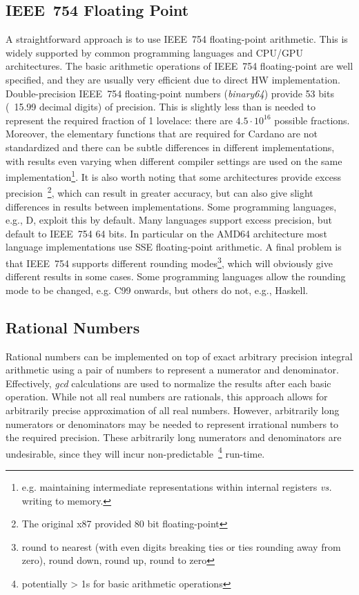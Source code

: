 \documentclass[11pt,a4paper,dvipsnames,twosided]{article}
\theoremstyle{definition}
\theoremstyle{definition}
\begin{document}
\subsection{IEEE~754 Floating Point}
\label{sec:ieee-754-floating}

A straightforward approach is to use IEEE~754 floating-point arithmetic.  This is
widely supported by common programming languages and CPU/GPU architectures.
%
The basic arithmetic operations of IEEE~754 floating-point are well specified,
and they are usually very efficient due to direct HW implementation.
%
Double-precision IEEE~754 floating-point numbers (\emph{binary64}) provide 53 bits (~15.99 decimal digits) of
precision.  This is slightly less than is needed to represent the
required fraction of 1 lovelace: there are $4.5\cdot10^{16}$ possible fractions.
Moreover, the  elementary functions that are required for Cardano are not standardized and there can be
subtle differences in different implementations, with results even varying when different compiler settings are used
on the same implementation\footnote{e.g. maintaining intermediate representations within internal registers \emph{vs.} writing to memory.}. It is also worth noting that some architectures
provide excess precision~\footnote{The original x87 provided 80 bit
  floating-point}, which can result in greater accuracy, but can also give slight differences in results
between implementations. Some programming languages, e.g., D, exploit this by default. Many
languages support excess precision, but default to IEEE~754 64 bits. In
particular on the AMD64 architecture most language implementations use SSE floating-point arithmetic.
A final problem is that IEEE~754 supports different rounding modes\footnote{round to nearest (with even digits breaking ties or ties rounding away from zero), round down, round up, round to zero},  which will obviously give
different results in some cases.  Some programming languages allow the rounding mode to be changed, e.g. C99 onwards, but others do
not, e.g., Haskell.

\subsection{Rational Numbers}
\label{sec:rational-numbers}

Rational numbers can be implemented on top of exact arbitrary precision integral
arithmetic using a pair of numbers to represent a numerator and denominator.
Effectively, \emph{gcd} calculations are used to normalize the results
after each basic operation. While not all real numbers are rationals, this approach allows for
arbitrarily precise approximation of all real numbers. However, arbitrarily
long numerators or denominators may be needed to represent irrational numbers to the required precision.
These arbitrarily long numerators and denominators are undesirable, since they will incur non-predictable~\footnote{potentially > 1s for basic arithmetic operations}
run-time.
\end{document}
